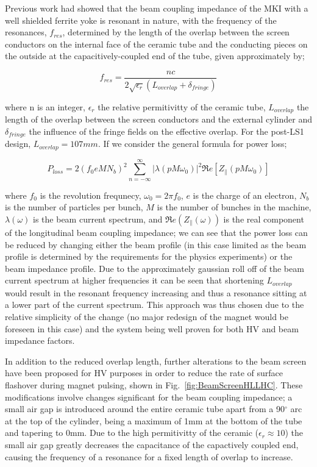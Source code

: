 \documentclass[a4paper,
              ]{jacow}
\begin{document}
Previous work had showed that the beam coupling impedance of the MKI with a well shielded ferrite yoke is resonant in nature, with the frequency of the resonances, $f_{res}$, determined by the length of the overlap between the screen conductors on the internal face of the ceramic tube and the conducting pieces on the outside at the capacitively-coupled end of the tube, given approximately by;

\begin{equation}
f_{res} = \frac{nc}{2\sqrt{\epsilon_{r}}\left( L_{overlap}+ \delta_{fringe} \right)}
\end{equation}

where n is an integer, $\epsilon_{r}$ the relative permitivitty of the ceramic tube, $L_{overlap}$ the length of the overlap between the screen conductors and the external cylinder and $\delta_{fringe}$ the influence of the fringe fields on the effective overlap. For the post-LS1 design, $L_{overlap} = 107mm$. If we consider the general formula for power loss;

\begin{equation}
P_{loss} = 2 \left( f_{0} e M  N_{b}\right)^{2} \displaystyle\sum\limits_{n = -\infty}^{\infty}  \left| \lambda \left( p M \omega_{0} \right)  \right|^{2} \Re{}e \left[ Z_{\parallel} \left( p M \omega_{0} \right) \right]
\label{eqn:powLoss}
\end{equation}

where $f_{0}$ is the revolution frequnecy, $\omega_{0} = 2\pi f_{0}$, $e$ is the charge of an electron, $N_{b}$ is the number of particles per bunch, $M$ is the number of bunches in the machine, $\lambda (\omega)$ is the beam current spectrum, and $\Re{}e(Z_{\parallel}(\omega))$ is the real component of the longitudinal beam coupling impedance; we can see that the power loss can be reduced by changing either the beam profile (in this case limited as the beam profile is determined by the requirements for the physics experiments) or the beam impedance profile. Due to the approximately gaussian roll off of the beam current spectrum at higher frequencies it can be seen that shortening $L_{overlap}$ would result in the resonant frequency increasing and thus a resonance sitting at a lower part of the current spectrum. This approach was thus chosen due to the relative simplicity of the change (no major redesign of the magnet would be foreseen in this case) and the system being well proven for both HV and beam impedance factors.

In addition to the reduced overlap length, further alterations to the beam screen have been proposed for HV purposes in order to reduce the rate of surface flashover during magnet pulsing, shown in Fig.~\ref{fig:BeamScreenHLLHC}. These modifications involve changes \cite{antoniosScreen} significant for the beam coupling impedance; a small air gap is introduced around the entire ceramic tube apart from a 90$^{\circ}$ arc at the top of the cylinder, being a maximum of 1mm at the bottom of the tube and tapering to 0mm. Due to the high permitivitty of the ceramic ($\epsilon_{r}\approx 10$) the small air gap greatly decreases the capacitance of the capactively coupled end, causing the frequency of a resonance for a fixed length of overlap to increase. 
\end{document}
